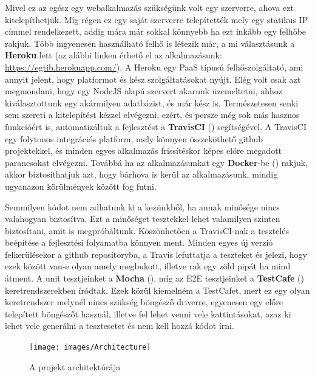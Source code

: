 Mivel ez az egész egy webalkalmazás szükségünk volt egy szerverre, ahova ezt kitelepíthetjük. Míg régen ez egy saját szerverre telepítették mely egy statikus IP címmel rendelkezett, addig mára már sokkal könnyebb ha ezt inkább egy felhőbe rakjuk. Több ingyenesen használható felhő is létezik már, a mi választásunk a \textbf{Heroku} lett (az alábbi linken érhető el az alkalmazásunk: \url{https://egtib.herokuapp.com/}). A Heroku egy PaaS típusú felhőszolgáltató, ami annyit jelent, hogy platformot és kész szolgáltatásokat nyújt. Elég volt csak azt megmondani, hogy egy NodeJS alapú szervert akarunk üzemeltetni, ahhoz kiválasztottunk egy akármilyen adatbázist, és már kész is. Természetesen senki sem szereti a kitelepítést kézzel elvégezni, ezért, és persze még sok más hasznos funkcióért is, automatizáltuk a fejlesztést a \textbf{TravisCI} (\cite{soft:travis}) segítségével. A TravisCI egy folytonos integrációs platform, mely könnyen összeköthető github projektekkel, és minden egyes alkalmazás frissítéskor képes előre megadott parancsokat elvégezni. Továbbá ha az alkalmazásunkat egy \textbf{Docker}-be (\cite{soft:docker}) rakjuk, akkor biztosíthatjuk azt, hogy bárhova is kerül az alkalmazásunk, mindig ugyanazon körülmények között fog futni.

Semmilyen kódot nem adhatunk ki a kezünkből, ha annak minősége nincs valahogyan biztosítva. Ezt a minőséget tesztekkel lehet valamilyen szinten biztosítani, amit is megpróbáltunk. Köszönhetően a TravisCI-nak a tesztelés beépítése a fejlesztési folyamatba könnyen ment. Minden egyes új verzió felkerülésekor a github repositoryba, a Travis lefuttatja a teszteket és jelezi, hogy ezek között van-e olyan amely megbukott, illetve rak egy zöld pipát ha mind átment. A unit tesztjeinket a \textbf{Mocha} (\cite{soft:mocha}), míg az E2E tesztjeinket a \textbf{TestCafe} (\cite{soft:testcafe}) keretrendszerekben íródtak. Ezek közül kiemelném a TestCafet, mert ez egy olyan keretrendszer melynél nincs szükség böngésző driverre, egyenesen egy előre telepített böngészőt használ, illetve fel lehet venni vele kattintásokat, azaz ki lehet vele generálni a tesztesetet és nem kell hozzá kódot írni.

\begin{figure}[ht!]
	\centering
	\texttt{[image: images/Architecture]}
	\caption{A projekt architektúrája\label{fig:Architecture}}
\end{figure}
